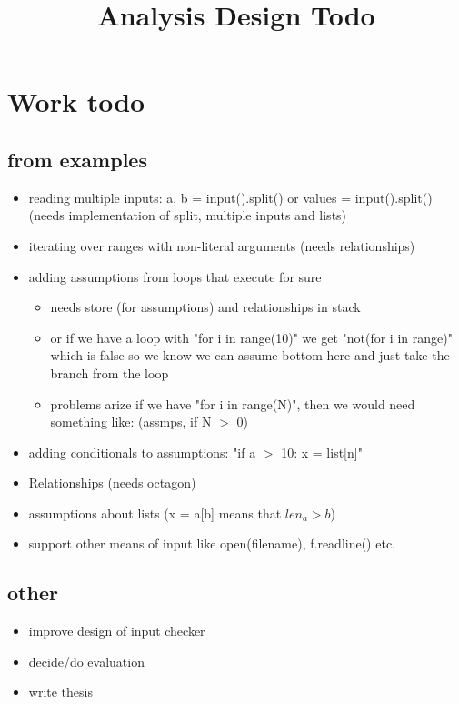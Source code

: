 \documentclass[11pt]{article}
\begin{document}
\title{Analysis Design Todo}

\maketitle


\section{Work todo}

\subsection{from examples}

\begin{itemize}
\item reading multiple inputs: a, b = input().split() or values = input().split() (needs implementation of split, multiple inputs and lists)
\item iterating over ranges with non-literal arguments (needs relationships)
\item adding assumptions from loops that execute for sure
        \begin{itemize}
        \item needs store (for assumptions) and relationships in stack
        \item or if we have a loop with "for i in range(10)" we get "not(for i in range)" which is false so we know we can assume bottom here and just take the branch from the loop
        \item problems arize if we have "for i in range(N)", then we would need something like: (assmps, if N $>$ 0)
        \end{itemize}
\item adding conditionals to assumptions: "if a $>$ 10: x = list[n]"
\item Relationships (needs octagon)
\item assumptions about lists (x = a[b] means that $len_a > b$)
\item support other means of input like open(filename), f.readline() etc.
\end{itemize}

\subsection{other}

\begin{itemize}
\item improve design of input checker
\item decide/do evaluation
\item write thesis
\end{itemize}
\end{document}
